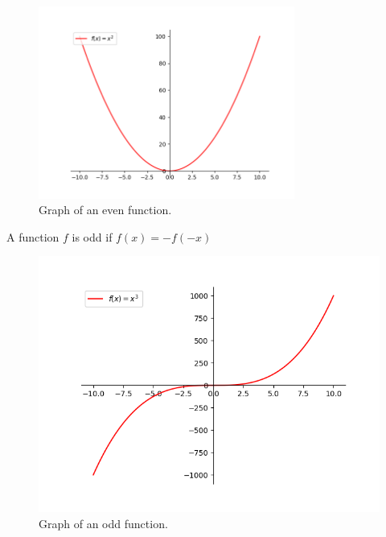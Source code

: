 \documentclass[a4paper]{article}
\theoremstyle{definition}
\begin{document}
\begin{figure}[ht]
    \begin{small}
        \begin{center}
            \includegraphics[width=0.75\textwidth]{../out/even.png}
        \end{center}
        \caption{Graph of an even function.}
        \label{fig: Even Function}
    \end{small}
\end{figure}

\pagebreak
A function \(f\) is odd if \(f(x) = - f(-x)\)

\begin{figure}[H]
    \begin{small}
        \begin{center}
            \includegraphics[width=0.75 \textwidth]{../out/odd.png}
        \end{center}
        \caption{Graph of an odd function.}
        \label{fig: Odd Function}

    \end{small}
\end{figure}
\end{document}
